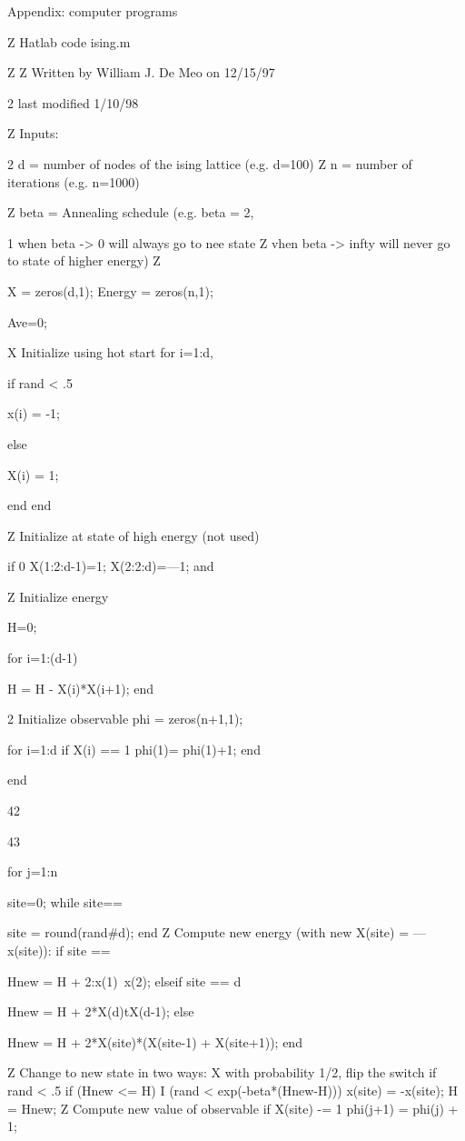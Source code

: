 Appendix: computer programs

Z Hatlab code ising.m

Z
Z Written by William J. De Meo on 12/15/97

2 last modified 1/10/98

Z Inputs:

2 d = number of nodes of the ising lattice (e.g. d=100)
Z n = number of iterations (e.g. n=1000)

Z beta = Annealing schedule (e.g. beta = 2,

1 when beta -> 0 will always go to nee state
Z vhen beta -> infty will never go to state of higher energy)
Z

X = zeros(d,1);
Energy = zeros(n,1);

Ave=0;

X Initialize using hot start
for i=1:d,

if rand < .5

x(i) = -1;

else

X(i) = 1;

end
end

Z Initialize at state of high energy (not used)

if 0
X(1:2:d-1)=1;
X(2:2:d)=—1;
and

Z Initialize energy

H=0;

for i=1:(d-1)

H = H - X(i)*X(i+1);
end

2 Initialize observable
phi = zeros(n+1,1);

for i=1:d
if X(i) == 1
phi(1)= phi(1)+1;
end

end

42

43

for j=1:n

site=0;
while site==

site = round(rand#d);
end
Z Compute new energy (with new X(site) = —x(site)):
if site ==

Hnew = H + 2:x(1)~x(2);
elseif site == d

Hnew = H + 2*X(d)tX(d-1);
else

Hnew = H + 2*X(site)*(X(site-1) + X(site+1));
end

Z Change to new state in two ways:
X with probability 1/2, flip the switch
if rand < .5
if (Hnew <= H) I (rand < exp(-beta*(Hnew-H)))
x(site) = -x(site);
H = Hnew;
Z Compute new value of observable
if X(site) -= 1
phi(j+1) = phi(j) + 1;

